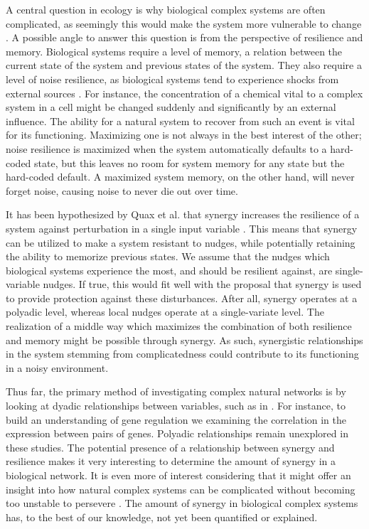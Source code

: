 \documentclass[../main.tex]{subfiles}
\begin{document}
A central question in ecology is why biological complex systems are often complicated, as seemingly this would make the system more vulnerable to change \cite{kondoh2003foraging, macarthur1955fluctuations}.
A possible angle to answer this question is from the perspective of resilience and memory.
Biological systems require a level of memory, a relation between the current state of the system and previous states of the system.
They also require a level of noise resilience, as biological systems tend to experience shocks from external sources \cite{peixoto2012emergence}. %
For instance, the concentration of a chemical vital to a complex system in a cell might be changed suddenly and significantly by an external influence.
The ability for a natural system to recover from such an event is vital for its functioning.
Maximizing one is not always in the best interest of the other; noise resilience is maximized when the system automatically defaults to a hard-coded state, but this leaves no room for system memory for any state but the hard-coded default.
A maximized system memory, on the other hand, will never forget noise, causing noise to never die out over time.

It has been hypothesized by Quax et al. that synergy increases the resilience of a system against perturbation in a single input variable \cite{quax2017quantifying}.
This means that synergy can be utilized to make a system resistant to nudges, while potentially retaining the ability to memorize previous states.
We assume that the nudges which biological systems experience the most, and should be resilient against, are single-variable nudges.
If true, this would fit well with the proposal that synergy is used to provide protection against these disturbances.
After all, synergy operates at a polyadic level, whereas local nudges operate at a single-variate level.
The realization of a middle way which maximizes the combination of both resilience and memory might be possible through synergy.
As such, synergistic relationships in the system stemming from complicatedness could contribute to its functioning in a noisy environment.

Thus far, the primary method of investigating complex natural networks is by looking at dyadic relationships between variables, such as in \cite{ideker2001integrated, lu2004gene, tononi1999measures}.
For instance, to build an understanding of gene regulation we examining the correlation in the expression between pairs of genes.
Polyadic relationships remain unexplored in these studies.
The potential presence of a relationship between synergy and resilience makes it very interesting to determine the amount of synergy in a biological network.
It is even more of interest considering that it might offer an insight into how natural complex systems can be complicated without becoming too unstable to persevere \cite{macarthur1955fluctuations, kondoh2003foraging}.
The amount of synergy in biological complex systems has, to the best of our knowledge, not yet been quantified or explained.
\end{document}
